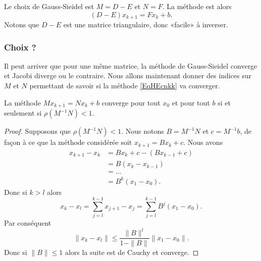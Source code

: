 Le choix de Gauss-Sieidel est \( M=D-E\) et \( N=F\). La méthode est alors
\begin{equation}
    (D-E)x_{k+1}=Fx_k+b.
\end{equation}
Notons que \( D-E\) est une matrice triangulaire, donc «facile» à inverser.

\subsubsection{Choix ?}

Il peut arriver que pour une même matrice, la méthode de Gauss-Sieidel converge et Jacobi diverge ou le contraire. Nous allons maintenant donner des indices sur \( M\) et \( N\) permettant de savoir si la méthode \eqref{EqHEcnkk} va converger.

\begin{proposition}
    La méthode \( Mx_{k+1}=Nx_k+b\) converge pour tout \( x_0\) et pour tout \( b\) si et seulement si \( \rho(M^{-1}N)<1\).
\end{proposition}

\begin{proof}
    Supposons que \( \rho(M^{-1}N)<1\). Nous notons \( B=M^{-1}N\) et \( c=M^{-1}b\), de façon à ce que la méthode considérée soit \( x_{k+1}=Bx_k+c\). Nous avons
    \begin{subequations}
        \begin{align}
            x_{k+1}-x_k&=Bx_k+c-(Bx_{k-1}+c)\\
            &=B(x_k-x_{k-1})\\
            &=\ldots\\
            &=B^k(x_1-x_0).
        \end{align}
    \end{subequations}
    Donc si \( k>l\) alors
    \begin{equation}
        x_k-x_l=\sum_{j=l}^{k-1}x_{j+1}-x_j=\sum_{j=l}^{k-1}B^j(x_1-x_0).
    \end{equation}
    Par conséquent
    \begin{equation}
        \| x_k-x_l \|\leq \frac{ \| B \|^l }{ 1-\| B \| }\| x_1-x_0 \|.
    \end{equation}
    Donc si \( \| B \|\leq 1\) alors la suite est de Cauchy et converge.
\end{proof}

